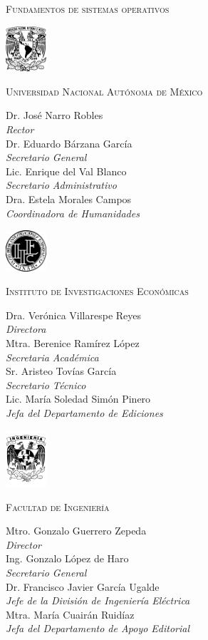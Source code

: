 \pagestyle{empty}
\renewcommand{\thepage}{\arabic{page}}

\textsc{Fundamentos de sistemas operativos}

\eject

\begin{center}
  \includegraphics[width=1.5cm]{unam/logo_unam}

  \textsc{Universidad Nacional Autónoma de México}

  Dr. José Narro Robles\\\textit{Rector}\\
  Dr. Eduardo Bárzana García\\\textit{Secretario General}\\
  Lic. Enrique del Val Blanco\\\textit{Secretario Administrativo}\\
  Dra. Estela Morales Campos\\\textit{Coordinadora de Humanidades}

  \vfill
  \includegraphics[width=1.5cm]{unam/logo_iiec}

  \textsc{Instituto de Investigaciones Económicas}

  Dra. Verónica Villarespe Reyes\\\textit{Directora}\\
  Mtra. Berenice Ramírez López\\\textit{Secretaria Académica}\\
  Sr. Aristeo Tovías García\\\textit{Secretario Técnico}\\
  Lic. María Soledad Simón Pinero\\\textit{Jefa del Departamento de Ediciones}

  \vfill
  \includegraphics[width=1.5cm]{unam/logo_fi}

  \textsc{Facultad de Ingeniería}

  Mtro. Gonzalo Guerrero Zepeda\\\textit{Director}\\
  Ing. Gonzalo López de Haro\\\textit{Secretario General}\\
  Dr. Francisco Javier García Ugalde\\\textit{Jefe de la División de
    Ingeniería Eléctrica}\\
  Mtra. María Cuairán Ruidíaz\\\textit{Jefa del Departamento de Apoyo Editorial}

\end{center}
